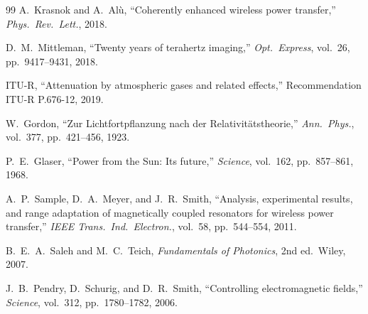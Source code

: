\documentclass[journal,twocolumn]{IEEEtran}
\begin{document}
\begin{thebibliography}{99}
A.~Krasnok and A.~Al\`{u}, ``Coherently enhanced wireless power
transfer,'' \emph{Phys.\ Rev.\ Lett.}, 2018.

D.~M.~Mittleman, ``Twenty years of terahertz imaging,''
\emph{Opt.\ Express}, vol.~26, pp.~9417--9431, 2018.

ITU-R, ``Attenuation by atmospheric gases and related effects,''
Recommendation ITU-R P.676-12, 2019.

W.~Gordon, ``Zur Lichtfortpflanzung nach der Relativit\"{a}tstheorie,''
\emph{Ann.\ Phys.}, vol.~377, pp.~421--456, 1923.

P.~E.~Glaser, ``Power from the Sun: Its future,''
\emph{Science}, vol.~162, pp.~857--861, 1968.

A.~P.~Sample, D.~A.~Meyer, and J.~R.~Smith, ``Analysis, experimental
results, and range adaptation of magnetically coupled resonators for
wireless power transfer,'' \emph{IEEE Trans.\ Ind.\ Electron.},
vol.~58, pp.~544--554, 2011.

B.~E.~A.~Saleh and M.~C.~Teich, \emph{Fundamentals of Photonics},
2nd ed.\ Wiley, 2007.

J.~B.~Pendry, D.~Schurig, and D.~R.~Smith, ``Controlling electromagnetic
fields,'' \emph{Science}, vol.~312, pp.~1780--1782, 2006.

\end{thebibliography}
\end{document}
